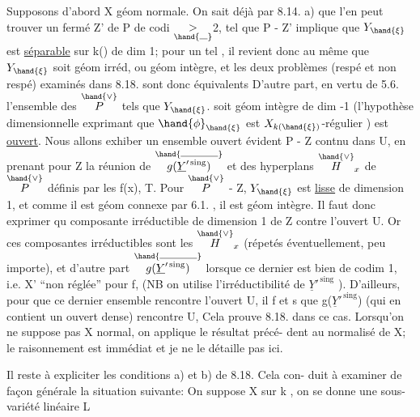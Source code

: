 

Supposons d'abord X géom normale. On sait déjà par 8.14. a)  que
l'en  peut trouver un fermé Z' de P de codi $\underset{\hand{\rule{0.7em}{0.35pt}}}{>}$2, tel que
\hand{$\xi\in$} P - Z'  implique que  $Y_{\hand{\xi}}$  est  \uline{séparable} sur k(\hand{$\xi$}) de  dim 1; pour
un tel \hand{$\xi$} , il revient donc au même que $Y_{\hand{\xi}}$ soit géom irréd, ou géom
intègre, et  les deux problèmes  (respé et non respé) examinés dans
8.18. sont donc équivalents D'autre part, en vertu de 5.6. l'ensemble
 des \hand{$\xi\in$} $\overset{\hand{\vee}}{P}$  tels que  $Y_{\hand{\xi}}$.  soit géom intègre de dim -1 (l'hypothèse
dimensionnelle exprimant que $\hand{\phi}_{\hand{\xi}}$ est $X_{k(\hand{\xi})}$-régulier ) est \uline{ouvert}.
Nous allons exhiber un ensemble ouvert  évident  P - Z  contnu dans U,
en prenant pour  Z la réunion de  $\overset{\hand{\rule{3.3em}{0.35pt}}}{g(\underline{Y}'^{\,\mathrm{sing}})}$  et des hyperplans $\overset{\hand{\vee}}{H}_x$
de $\overset{\hand{\vee}}{P}$  définis par les  f(x),  T.  Pour \hand{$\xi\in$} $\overset{\hand{\vee}}{P}$ - Z,  $Y_{\hand{\xi}}$  est \uline{lisse}
de dimension 1, et comme il est géom connexe par 6.1. , il est géom
intègre.  Il faut donc  exprimer qu  composante irréductible
de dimension  1 de Z  contre l'ouvert U.  Or ces composantes
irréductibles sont les  $\overset{\hand{\vee}}{H}_x$  (répetés éventuellement, peu importe), et
d'autre part $\overset{\hand{\rule{3.3em}{0.35pt}}}{g(\underline{Y}'^{\,\mathrm{sing}})}$  lorsque  ce dernier  est bien de codim 1, i.e.
X' ``non réglée'' pour f, (NB on utilise l'irréductibilité de  $\underline{Y}'^{\,\mathrm{sing}}$ ).
D'ailleurs, pour que ce dernier ensemble rencontre  l'ouvert U,
il f et s  que  g($\underline{Y}'^{\,\mathrm{sing}}$)  (qui en contient un ouvert dense) rencontre
U,  Cela prouve 8.18. dans ce
cas.  Lorsqu'on ne suppose pas X normal, on applique le résultat précé-%
dent au normalisé de X; le raisonnement est immédiat et je ne le détaille
pas ici.  

Il reste à expliciter  les conditions a) et b) de 8.18. Cela con-%
duit à examiner de façon générale la situation suivante:  On suppose
X  sur k , on se donne une sous-variété linéaire  L 

